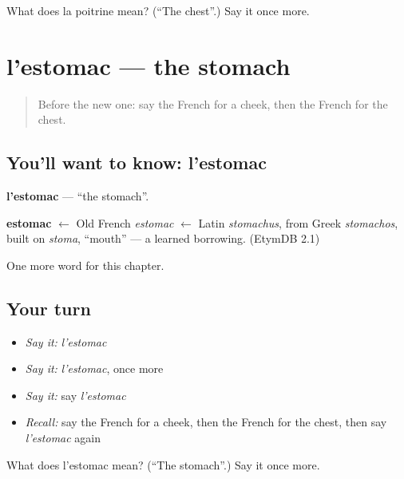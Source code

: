 \begin{tcolorbox}[breakable,colback=teal!4,colframe=teal!35!black,title={Before you move on}]
What does la poitrine mean? (\textquotedblleft{}The chest\textquotedblright{}.) Say it once more.
\end{tcolorbox}
\section[l'estomac]{l'estomac — the stomach}

\label{lesson:FR-C52-estomac}



\begin{quote}
Before the new one: say the French for a cheek, then the French for the chest.
\end{quote}

\subsection*{You'll want to know: l'estomac}
\textbf{l'estomac} — \textquotedblleft{}the stomach\textquotedblright{}.

\begin{cousinweb}
\textbf{estomac} $\leftarrow$ Old French \emph{estomac} $\leftarrow$ Latin \emph{stomachus}, from Greek \emph{stomachos}, built on \emph{stoma}, \textquotedblleft{}mouth\textquotedblright{} — a learned borrowing. (EtymDB 2.1)
\end{cousinweb}

\begin{grammarlens}[title={What you've built}]
One more word for this chapter.
\end{grammarlens}

\subsection*{Your turn}
\begin{itemize}
\raggedright
  \item \emph{Say it:} \emph{l'estomac}
  \item \emph{Say it:} \emph{l'estomac}, once more
  \item \emph{Say it:} say \emph{l'estomac}
  \item \emph{Recall:} say the French for a cheek, then the French for the chest, then say \emph{l'estomac} again
\end{itemize}

\begin{tcolorbox}[breakable,colback=teal!4,colframe=teal!35!black,title={Before you move on}]
What does l'estomac mean? (\textquotedblleft{}The stomach\textquotedblright{}.) Say it once more.
\end{tcolorbox}
